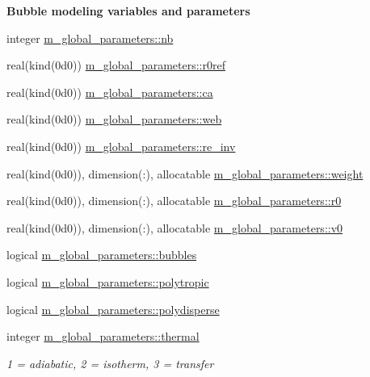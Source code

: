 \begin{Indent}\textbf{ Bubble modeling variables and parameters}\par
\begin{DoxyCompactItemize}
\item 
integer \hyperlink{namespacem__global__parameters_ad76c4758994b52559f478d251dc0cba5}{m\+\_\+global\+\_\+parameters\+::nb}
\item 
real(kind(0d0)) \hyperlink{namespacem__global__parameters_a24492f9b474683476a342e7ee42c1c6d}{m\+\_\+global\+\_\+parameters\+::r0ref}
\item 
real(kind(0d0)) \hyperlink{namespacem__global__parameters_a1fcd6cc13ad7f604ef81708716a1feac}{m\+\_\+global\+\_\+parameters\+::ca}
\item 
real(kind(0d0)) \hyperlink{namespacem__global__parameters_af2ed21959a90158c2459574230cdfcff}{m\+\_\+global\+\_\+parameters\+::web}
\item 
real(kind(0d0)) \hyperlink{namespacem__global__parameters_a4438313a11564fa911c586d2dee15b8d}{m\+\_\+global\+\_\+parameters\+::re\+\_\+inv}
\item 
real(kind(0d0)), dimension(\+:), allocatable \hyperlink{namespacem__global__parameters_a121ed97f0ae913d37bce5bbf1c7b2cc2}{m\+\_\+global\+\_\+parameters\+::weight}
\item 
real(kind(0d0)), dimension(\+:), allocatable \hyperlink{namespacem__global__parameters_a585a72037bbffe12e8d4512a57f52418}{m\+\_\+global\+\_\+parameters\+::r0}
\item 
real(kind(0d0)), dimension(\+:), allocatable \hyperlink{namespacem__global__parameters_a334b440356a4353d073c43e68c2372da}{m\+\_\+global\+\_\+parameters\+::v0}
\item 
logical \hyperlink{namespacem__global__parameters_a4a22ed160838f8fbe6bd506f334b8815}{m\+\_\+global\+\_\+parameters\+::bubbles}
\item 
logical \hyperlink{namespacem__global__parameters_a8d670f2f984167bae71b7b3f12d0908a}{m\+\_\+global\+\_\+parameters\+::polytropic}
\item 
logical \hyperlink{namespacem__global__parameters_a32791d9d5fef0213f01fc31713b17ae8}{m\+\_\+global\+\_\+parameters\+::polydisperse}
\item 
integer \hyperlink{namespacem__global__parameters_a17169a5387f8f1efd5ac34cb4eae7c81}{m\+\_\+global\+\_\+parameters\+::thermal}
\begin{DoxyCompactList}\small\item\em 1 = adiabatic, 2 = isotherm, 3 = transfer \end{DoxyCompactList}\item 

\end{DoxyCompactItemize}
\end{Indent}
